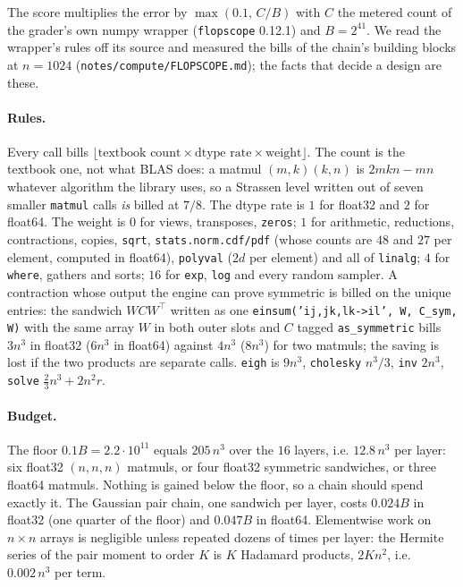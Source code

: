\label{sec:cost}
The score multiplies the error by $\max(0.1,\,C/B)$ with $C$ the metered count of the grader's own numpy wrapper
(\texttt{flopscope} 0.12.1) and $B=2^{41}$. We read the wrapper's rules off its source and measured the bills of
the chain's building blocks at $n=1024$ (\texttt{notes/compute/FLOPSCOPE.md}); the facts that decide a design are
these.

\paragraph{Rules.} Every call bills $\lfloor\text{textbook count}\times\text{dtype rate}\times\text{weight}\rfloor$.
The count is the textbook one, not what BLAS does: a matmul $(m,k)(k,n)$ is $2mkn-mn$ whatever algorithm the
library uses, so a Strassen level written out of seven smaller \texttt{matmul} calls \emph{is} billed at $7/8$.
The dtype rate is $1$ for float32 and $2$ for float64. The weight is $0$ for views, transposes, \texttt{zeros};
$1$ for arithmetic, reductions, contractions, copies, \texttt{sqrt}, \texttt{stats.norm.cdf/pdf} (whose counts are
$48$ and $27$ per element, computed in float64), \texttt{polyval} ($2d$ per element) and all of \texttt{linalg};
$4$ for \texttt{where}, gathers and sorts; $16$ for \texttt{exp}, \texttt{log} and every random sampler. A
contraction whose output the engine can prove symmetric is billed on the unique entries: the sandwich
$WCW^\top$ written as one \texttt{einsum('ij,jk,lk->il', W, C\_sym, W)} with the same array $W$ in both outer
slots and $C$ tagged \texttt{as\_symmetric} bills $3n^3$ in float32 ($6n^3$ in float64) against $4n^3$ ($8n^3$) for
two matmuls; the saving is lost if the two products are separate calls. \texttt{eigh} is $9n^3$, \texttt{cholesky}
$n^3/3$, \texttt{inv} $2n^3$, \texttt{solve} $\tfrac23n^3+2n^2r$.

\paragraph{Budget.} The floor $0.1B=2.2\cdot10^{11}$ equals $205\,n^3$ over the $16$ layers, i.e.
$12.8\,n^3$ per layer: six float32 $(n,n,n)$ matmuls, or four float32 symmetric sandwiches, or three float64
matmuls. Nothing is gained below the floor, so a chain should spend exactly it. The Gaussian pair chain,
one sandwich per layer, costs $0.024B$ in float32 (one quarter of the floor) and $0.047B$ in float64.
Elementwise work on $n\times n$ arrays is negligible unless repeated dozens of times per layer: the Hermite series
of the pair moment to order $K$ is $K$ Hadamard products, $2Kn^2$, i.e.\ $0.002\,n^3$ per term.

